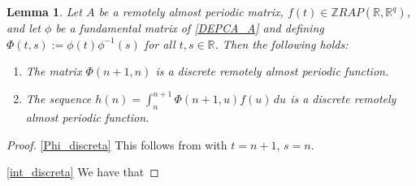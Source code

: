 \documentclass[english,,reqno]{amsart}
\numberwithin{equation}{section}
\theoremstyle{plain}
\newtheorem{lem}[thm]{Lemma}
\theoremstyle{definition}
\theoremstyle{remark}
\begin{document}
\begin{lem}\label{coef_ecua_diferencia}
Let $A$ be a remotely almost periodic matrix, $f(t) \in \mathbb{Z}RAP(\mathbb{R}, \mathbb{R}^q)$, and let $\phi$ be a fundamental matrix of \eqref{DEPCA_A} and defining $\Phi(t,s):=\phi(t)\phi^{-1}(s)$ for all $t,s\in\mathbb{R}$. Then the following holds:  
\begin{enumerate}
\item \label{Phi_discreta} The matrix $\Phi(n+1, n)$ is a discrete remotely almost periodic function.
\item \label{int_discreta} The sequence $h(n) = \int_{n}^{n+1} \Phi(n+1, u) f(u)\, du$ is a discrete remotely almost periodic function.
\end{enumerate}
\end{lem}
\begin{proof}
\eqref{Phi_discreta} This follows from \cite[Theorem 2]{pinto_remotely} with $t = n + 1$, $s = n$.

\eqref{int_discreta} We have that


\end{proof}
\end{document}
